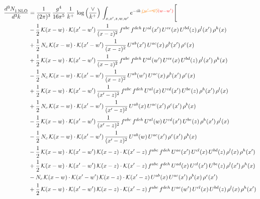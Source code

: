\documentclass[9pt]{article}
\numberwithin{equation}{section}
\begin{document}
\begin{align}
\frac{d^{3}N_{1\,\rm NLO}^{\rm}}{d^{3}k}  & = \frac{1}{(2\pi)^{3}}\,\frac{g^{4}}{16\pi^{5}}\,\frac{1}{k^{+}}\,\log{\left(\frac{\vee}{k^{+}}\right)}\, \int_{x,x',z,w,w'}e^{-ik\cdot{\color{orange}\cancel{(w'-w)}}{\color{red}(w-w')}}\Bigg[\notag\\ & -\frac{1}{2}\,\mathcal{K}(x-w)\cdot\mathcal{K}(x'-w')\,\frac{1}{(x-z)^{2}}\,f^{abc}\,f^{deh}\,U^{al}(x')\,U^{ce}(x)\,U^{bd}(z)\,\rho^{l}(x')\,\rho^{h}(x)\notag\\
&+\frac{1}{2}\,N_{c}\,\mathcal{K}(x-w)\cdot\mathcal{K}(x'-w')\,\frac{1}{(x-z)^{2}}\,U^{ab}(x')\,U^{ac}(x)\,\rho^{b}(x')\,\rho^{c}(x)\notag\\
&+\frac{1}{2}\,\mathcal{K}(x-w)\cdot\mathcal{K}(x'-w')\,\frac{1}{(x-z)^{2}}\,f^{abc}\,f^{deh}\,U^{al}(w')\,U^{ce}(x)\,U^{bd}(z)\,\rho^{l}(x')\,\rho^{h}(x)\notag\\
&-\frac{1}{2}\,N_{c}\,\mathcal{K}(x-w)\cdot\mathcal{K}(x'-w')\,\frac{1}{(x-z)^{2}}\,U^{ab}(w')\,U^{ac}(x)\,\rho^{b}(x')\,\rho^{c}(x)\notag\\
&+\frac{1}{2}\,\mathcal{K}(x-w)\cdot\mathcal{K}(x'-w')\,\frac{1}{(x'-z)^{2}}\,f^{abc}\,f^{deh}\,U^{al}(x)\,U^{cd}(x')\,U^{be}(z)\,\rho^{h}(x')\,\rho^{l}(x)\notag\\
&+\frac{1}{2}\,N_{c}\,\mathcal{K}(x-w)\cdot\mathcal{K}(x'-w')\,\frac{1}{(x'-z)^{2}}\,U^{ab}(x)\,U^{ac}(x')\,\rho^{c}(x')\,\rho^{b}(x)\notag\\
&-\frac{1}{2}\,\mathcal{K}(x-w)\cdot\mathcal{K}(x'-w')\,\frac{1}{(x'-z)^{2}}\,f^{abc}\,f^{deh}\,U^{al}(w)\,U^{cd}(x')\,U^{be}(z)\,\rho^{h}(x')\,\rho^{l}(x)\notag\\
&-\frac{1}{2}\,N_{c}\,\mathcal{K}(x-w)\cdot\mathcal{K}(x'-w')\,\frac{1}{(x'-z)^{2}}\,U^{ab}(w)\,U^{ac}(x')\,\rho^{c}(x')\,\rho^{b}(x)\notag\\
&-\frac{1}{2}\,\mathcal{K}(x-w)\cdot\mathcal{K}(x'-w')\,\mathcal{K}(x-z)\cdot\mathcal{K}(x'-z)\,f^{abc}\,f^{deh}\,U^{ae}(x')\,U^{cl}(x)\,U^{bd}(z)\,\rho^{l}(x)\,\rho^{h}(x')\notag\\
&+\frac{1}{2}\,\mathcal{K}(x-w)\cdot\mathcal{K}(x'-w')\,\mathcal{K}(x-z)\cdot\mathcal{K}(x'-z)\,f^{abc}\,f^{deh}\,U^{ad}(x)\,U^{cl}(x')\,U^{be}(z)\,\rho^{l}(x')\,\rho^{h}(x)\notag\\
&-N_{c}\,\mathcal{K}(x-w)\cdot\mathcal{K}(x'-w')\,\mathcal{K}(x-z)\cdot\mathcal{K}(x'-z)\,U^{ab}(x)\,U^{ac}(x')\,\rho^{b}(x)\,\rho^{c}(x')\notag\\
&+\frac{1}{2}\,\mathcal{K}(x-w)\cdot\mathcal{K}(x'-w')\,\mathcal{K}(x-z)\cdot\mathcal{K}(x'-z)\,f^{abc}\,f^{deh}\,U^{ae}(w')\,U^{cl}(x)\,U^{bd}(z)\,\rho^{l}(x)\,\rho^{h}(x')\notag\\

\end{align}
\end{document}
